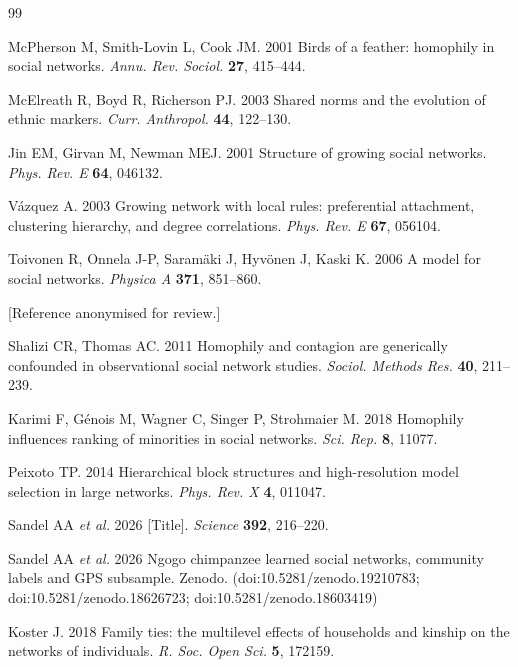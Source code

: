 \documentclass[11pt]{article}
\begin{document}
\begin{thebibliography}{99}
\setlength{\itemsep}{0pt}\small

McPherson M, Smith-Lovin L, Cook JM. 2001 Birds of a feather: homophily in social networks.
\textit{Annu. Rev. Sociol.} \textbf{27}, 415--444.

McElreath R, Boyd R, Richerson PJ. 2003 Shared norms and the evolution of ethnic markers.
\textit{Curr. Anthropol.} \textbf{44}, 122--130.

Jin EM, Girvan M, Newman MEJ. 2001 Structure of growing social networks. \textit{Phys. Rev. E}
\textbf{64}, 046132.

V\'azquez A. 2003 Growing network with local rules: preferential attachment, clustering hierarchy, and
degree correlations. \textit{Phys. Rev. E} \textbf{67}, 056104.

Toivonen R, Onnela J-P, Saram\"aki J, Hyv\"onen J, Kaski K. 2006 A model for social networks.
\textit{Physica A} \textbf{371}, 851--860.

[Reference anonymised for review.]

Shalizi CR, Thomas AC. 2011 Homophily and contagion are generically confounded in observational social
network studies. \textit{Sociol. Methods Res.} \textbf{40}, 211--239.

Karimi F, G\'enois M, Wagner C, Singer P, Strohmaier M. 2018 Homophily influences ranking of minorities
in social networks. \textit{Sci. Rep.} \textbf{8}, 11077.

Peixoto TP. 2014 Hierarchical block structures and high-resolution model selection in large networks.
\textit{Phys. Rev. X} \textbf{4}, 011047.

Sandel AA \textit{et al.} 2026 [Title]. \textit{Science} \textbf{392}, 216--220.

Sandel AA \textit{et al.} 2026 Ngogo chimpanzee learned social networks, community labels and GPS
subsample. Zenodo. (doi:10.5281/zenodo.19210783; doi:10.5281/zenodo.18626723;
doi:10.5281/zenodo.18603419)

Koster J. 2018 Family ties: the multilevel effects of households and kinship on the networks of
individuals. \textit{R. Soc. Open Sci.} \textbf{5}, 172159.


\end{thebibliography}
\end{document}
